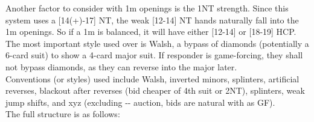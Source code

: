 \documentclass[12pt]{report}
\newcommand{\n}{\\}
\begin{document}
    Another factor to consider with 1m openings is the 1NT strength.  Since this system uses a [14(+)-17] NT, the weak [12-14] NT hands naturally fall into the 1m openings.  So if a 1m is balanced, it will have either [12-14] or [18-19] HCP.\n

    The most important style used over  is Walsh, a bypass of diamonds (potentially a 6-card suit) to show a 4-card major suit.  If responder is game-forcing, they shall not bypass diamonds, as they can reverse into the major later.\n

    Conventions (or styles) used include Walsh, inverted minors, splinters, artificial reverses, blackout after reverses (bid cheaper of 4th suit or 2NT), splinters, weak jump shifts, and xyz (excluding -- auction, bids are natural with  as GF). \n
    
    The full structure is as follows:
\end{document}
